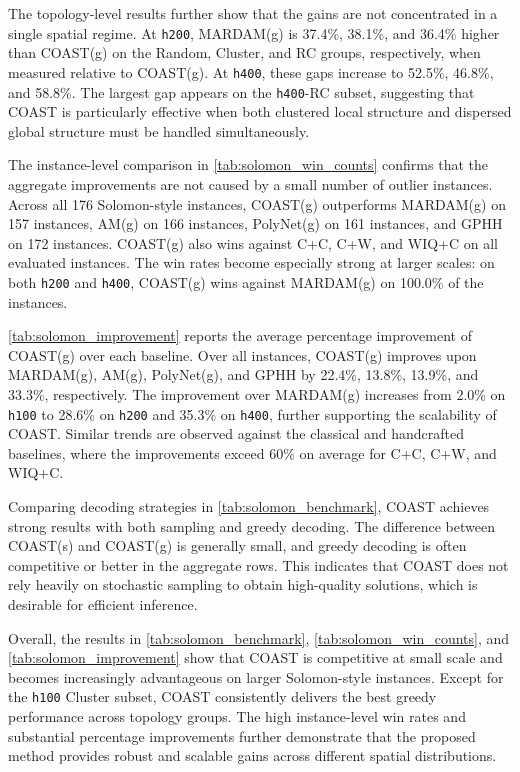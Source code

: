 \documentclass[conference]{IEEEtran}
\begin{document}
The topology-level results further show that the gains are not concentrated in a single spatial regime. At \texttt{h200}, MARDAM(g) is 37.4\%, 38.1\%, and 36.4\% higher than COAST(g) on the Random, Cluster, and RC groups, respectively, when measured relative to COAST(g). At \texttt{h400}, these gaps increase to 52.5\%, 46.8\%, and 58.8\%. The largest gap appears on the \texttt{h400}-RC subset, suggesting that COAST is particularly effective when both clustered local structure and dispersed global structure must be handled simultaneously.

The instance-level comparison in \autoref{tab:solomon_win_counts} confirms that the aggregate improvements are not caused by a small number of outlier instances. Across all 176 Solomon-style instances, COAST(g) outperforms MARDAM(g) on 157 instances, AM(g) on 166 instances, PolyNet(g) on 161 instances, and GPHH on 172 instances. COAST(g) also wins against C+C, C+W, and WIQ+C on all evaluated instances. The win rates become especially strong at larger scales: on both \texttt{h200} and \texttt{h400}, COAST(g) wins against MARDAM(g) on 100.0\% of the instances.

\autoref{tab:solomon_improvement} reports the average percentage improvement of COAST(g) over each baseline. Over all instances, COAST(g) improves upon MARDAM(g), AM(g), PolyNet(g), and GPHH by 22.4\%, 13.8\%, 13.9\%, and 33.3\%, respectively. The improvement over MARDAM(g) increases from 2.0\% on \texttt{h100} to 28.6\% on \texttt{h200} and 35.3\% on \texttt{h400}, further supporting the scalability of COAST. Similar trends are observed against the classical and handcrafted baselines, where the improvements exceed 60\% on average for C+C, C+W, and WIQ+C.

Comparing decoding strategies in \autoref{tab:solomon_benchmark}, COAST achieves strong results with both sampling and greedy decoding. The difference between COAST(s) and COAST(g) is generally small, and greedy decoding is often competitive or better in the aggregate rows. This indicates that COAST does not rely heavily on stochastic sampling to obtain high-quality solutions, which is desirable for efficient inference.

Overall, the results in \autoref{tab:solomon_benchmark}, \autoref{tab:solomon_win_counts}, and \autoref{tab:solomon_improvement} show that COAST is competitive at small scale and becomes increasingly advantageous on larger Solomon-style instances. Except for the \texttt{h100} Cluster subset, COAST consistently delivers the best greedy performance across topology groups. The high instance-level win rates and substantial percentage improvements further demonstrate that the proposed method provides robust and scalable gains across different spatial distributions.
\end{document}
